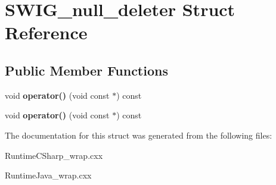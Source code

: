 \hypertarget{struct_s_w_i_g__null__deleter}{}\section{S\+W\+I\+G\+\_\+null\+\_\+deleter Struct Reference}
\label{struct_s_w_i_g__null__deleter}
\subsection*{Public Member Functions}
\begin{DoxyCompactItemize}
\item 
\hypertarget{struct_s_w_i_g__null__deleter_a4371bf16d1ca6d6973bee381f49f4654}{}\label{struct_s_w_i_g__null__deleter_a4371bf16d1ca6d6973bee381f49f4654} 
void {\bfseries operator()} (void const $\ast$) const
\item 
\hypertarget{struct_s_w_i_g__null__deleter_a4371bf16d1ca6d6973bee381f49f4654}{}\label{struct_s_w_i_g__null__deleter_a4371bf16d1ca6d6973bee381f49f4654} 
void {\bfseries operator()} (void const $\ast$) const
\end{DoxyCompactItemize}


The documentation for this struct was generated from the following files\+:\begin{DoxyCompactItemize}
\item 
Runtime\+C\+Sharp\+\_\+wrap.\+cxx\item 
Runtime\+Java\+\_\+wrap.\+cxx\end{DoxyCompactItemize}
